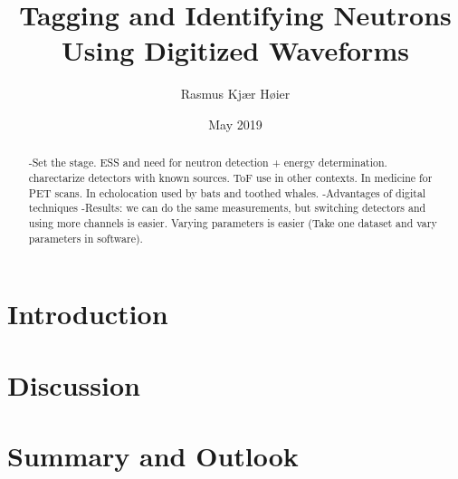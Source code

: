 \documentclass[12pt]{article}
\title{Tagging and Identifying Neutrons Using Digitized Waveforms}
\author{Rasmus Kjær Høier}
\date{May 2019}
\begin{document}
\maketitle

\newpage
\setcounter{tocdepth}{2}
\tableofcontents

\newpage
\begin{abstract}
-Set the stage. ESS and need for neutron detection + energy determination. charectarize detectors with known sources. ToF use in other contexts. In medicine for PET scans. In echolocation used by bats and toothed whales.
-Advantages of digital techniques
-Results: we can do the same measurements, but switching detectors and using more channels is easier. Varying parameters is easier (Take one dataset and vary parameters in software).\cite{Leo}
\end{abstract}

\newpage
\onehalfspacing
{}
\setcounter{page}{1}
\section{Introduction}
\clearpage
\clearpage
\clearpage
\clearpage
\clearpage
\clearpage
\clearpage
\section{Discussion}%
\clearpage
\section{Summary and Outlook}%
\clearpage

\end{document}
